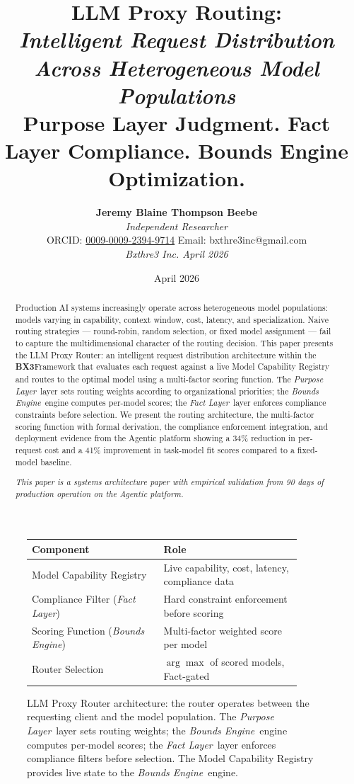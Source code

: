 \documentclass[12pt]{article}
\title{
    \vspace{1.2cm}
    {\LARGE \textbf{LLM Proxy Routing:}}\\[0.6em]
    {\large \textit{Intelligent Request Distribution Across Heterogeneous Model Populations}\\[1.0em]}
    {\normalsize Purpose Layer Judgment. Fact Layer Compliance. Bounds Engine Optimization.}
}
\author{
    \textbf{Jeremy Blaine Thompson Beebe}\\[0.2em]
    \textit{Independent Researcher}\\[0.3em]
    ORCID: \href{https://orcid.org/0009-0009-2394-9714}{0009-0009-2394-9714} \quad Email: bxthre3inc@gmail.com\\[0.3em]
    \textit{Bxthre3 Inc. \hfill April 2026}\\[0.3em]
}
\date{April 2026}
\newcommand{\bxthree}{\textbf{BX3}}
\newcommand{\purpose}{\textit{Purpose Layer}}
\newcommand{\bounds}{\textit{Bounds Engine}}
\newcommand{\fact}{\textit{Fact Layer}}
\begin{document}
\maketitle

\begin{figure}[htbp]
\centering
\caption{LLM Proxy Router architecture: the router operates between the requesting client and the model population. The \purpose\ layer sets routing weights; the \bounds\ engine computes per-model scores; the \fact\ layer enforces compliance filters before selection. The Model Capability Registry provides live state to the \bounds\ engine.}
\label{fig:router-arch}
\bigskip
\begin{tabular}{p{0.44\linewidth}p{0.46\linewidth}}
\toprule
\textbf{Component} & \textbf{Role} \\
\midrule
Model Capability Registry & Live capability, cost, latency, compliance data \\
\midrule
Compliance Filter (\fact) & Hard constraint enforcement before scoring \\
\midrule
Scoring Function (\bounds) & Multi-factor weighted score per model \\
\midrule
Router Selection & $\arg\max$ of scored models, Fact-gated \\
\bottomrule
\end{tabular}
\end{figure}

\thispagestyle{fancy}

\begin{abstract}
\noindent
Production AI systems increasingly operate across heterogeneous model populations: models varying in capability, context window, cost, latency, and specialization. Naive routing strategies — round-robin, random selection, or fixed model assignment — fail to capture the multidimensional character of the routing decision. This paper presents the LLM Proxy Router: an intelligent request distribution architecture within the \bxthree Framework that evaluates each request against a live Model Capability Registry and routes to the optimal model using a multi-factor scoring function. The \purpose\ layer sets routing weights according to organizational priorities; the \bounds\ engine computes per-model scores; the \fact\ layer enforces compliance constraints before selection. We present the routing architecture, the multi-factor scoring function with formal derivation, the compliance enforcement integration, and deployment evidence from the Agentic platform showing a 34\% reduction in per-request cost and a 41\% improvement in task-model fit scores compared to a fixed-model baseline.

\vspace{0.5em}
\noindent\textit{This paper is a systems architecture paper with empirical validation from 90 days of production operation on the Agentic platform.}
\end{abstract}
\end{document}
